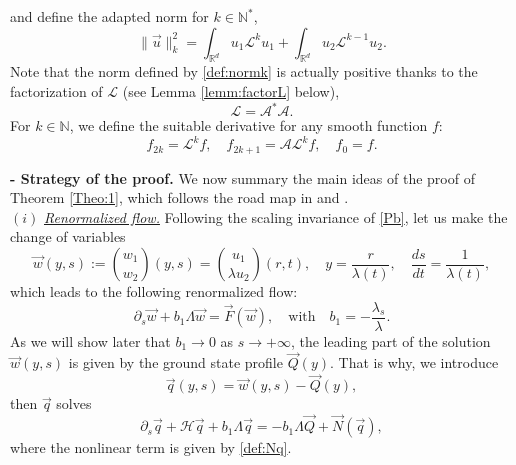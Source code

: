 \documentclass[11pt]{aims}
\theoremstyle{definition}
\numberwithin{equation}{section}
\begin{document}
and define the adapted norm for $k \in \mathbb{N}^*$,
\begin{equation}\label{def:normk}
\|\vec u\|_{k}^2 = \int_{{\mathbb{R}}^d} u_1 {\mathscr{L}}^{k}u_1 + \int_{{\mathbb{R}}^d} u_2 {\mathscr{L}}^{k - 1}u_2.
\end{equation}
Note that the norm defined by \eqref{def:normk} is actually positive thanks to the factorization of ${\mathscr{L}}$ (see Lemma \ref{lemm:factorL} below), 
$${\mathscr{L}} = {\mathscr{A}}^* {\mathscr{A}}.$$
For $k \in \mathbb{N}$, we define the suitable derivative for any smooth function $f$:
\begin{equation}\label{def:adapder}
f_{2k} = {\mathscr{L}}^kf, \quad f_{2k + 1} = {\mathscr{A}} {\mathscr{L}}^k f, \quad f_0 = f.
\end{equation}

\medskip

\noindent \textbf{- Strategy of the proof.}  We now summary the main ideas of the proof of Theorem \ref{Theo:1}, which follows the road map in \cite{IGN16} and \cite{MRRcjm15}.\\

\noindent $(i)$ \underline{\textit{Renormalized flow.}} Following the scaling invariance of \eqref{Pb}, let us make the change of variables
\begin{equation*}
\vec w(y,s) := \binom{w_1}{w_2}(y,s) = \binom{u_1}{\lambda u_2}(r,t), \quad y = \frac{r}{\lambda(t)}, \quad \frac{ds}{dt} = \frac{1}{\lambda(t)},
\end{equation*}
which leads to the following renormalized flow:
\begin{equation}\label{eq:wys_i}
{\partial_s} \vec w + b_1 \Lambda \vec w= \vec F (\vec w),  \quad \text{with} \quad  b_1 = -\frac{\lambda_s}{\lambda}.
\end{equation}
As we will show later that $b_1 \to 0$ as $s \to +\infty$, the leading part of the solution $\vec w(y,s)$ is given by the ground state profile $\vec Q(y)$. That is why, we introduce 
$$\vec q(y,s) = \vec w(y,s) - \vec Q(y),$$
then $\vec q$ solves 
\begin{equation}\label{eq:qys_i}
{\partial_s} \vec{q} + {\mathscr{H}} \vec q  + b_1 \Lambda \vec q = -b_1 \Lambda \vec Q + \vec{N}(\vec q),
\end{equation}
where the nonlinear term is given by \eqref{def:Nq}.
\end{document}
